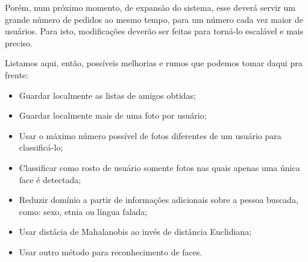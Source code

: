 \documentclass[10pt,a4paper]{article}
\begin{document}
	Porém, num próximo momento, de expansão do sistema, esse deverá servir um grande número de pedidos ao mesmo tempo, para um número cada vez maior de usuários. Para isto, modificações deverão ser feitas para torná-lo escalável e mais preciso. 

Listamos aqui, então, possíveis melhorias e rumos que podemos tomar
daqui pra frente:
\begin{itemize}
	\item Guardar localmente as listas de amigos obtidas;
	\item Guardar localmente mais de uma foto por usuário;
	\item Usar o máximo número possível de fotos diferentes de um usuário para classificá-lo;
	\item Classificar como rosto de usuário somente fotos nas quais apenas uma única face é detectada;
	\item Reduzir domínio a partir de informações adicionais sobre a pessoa buscada, como: sexo, etnia ou língua falada;
	\item Usar distâcia de Mahalanobis ao invés de distância Euclidiana;
	\item Usar outro método para reconhecimento de faces.
\end{itemize}
\vspace{-0.5cm}

\begin{small}
  
\end{small}
\end{document}
